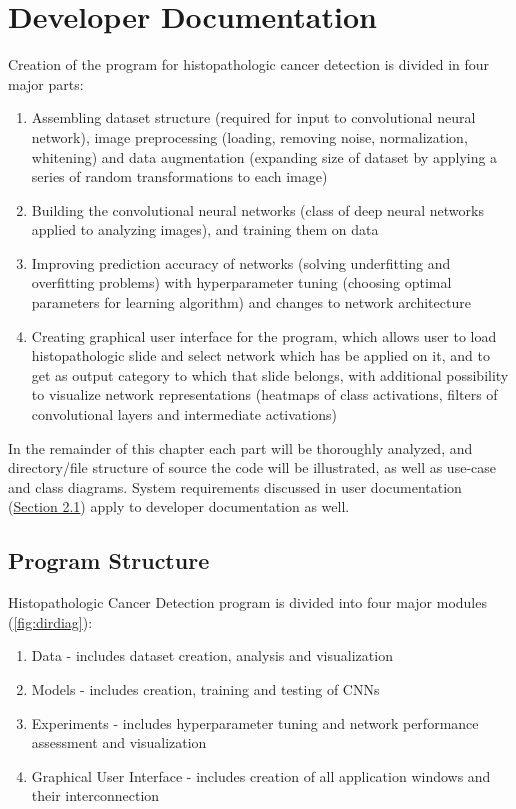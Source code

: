 \chapter{Developer Documentation} %
\label{ch:impl}

Creation of the program for histopathologic cancer detection is divided in four major parts:
\begin{enumerate}
	\itemsep0em
	\item Assembling dataset structure (required for input to convolutional neural network), image preprocessing (loading, removing noise, normalization, whitening) and data augmentation (expanding size of dataset by applying a series of random transformations to each image)
	\item Building the convolutional neural networks (class of deep neural networks applied to analyzing images), and training them on data
	\item Improving prediction accuracy of networks (solving underfitting and overfitting problems) with hyperparameter tuning (choosing optimal parameters for learning algorithm) and changes to network architecture
	\item Creating graphical user interface for the program, which allows user to load histopathologic slide and select network which has be applied on it, and to get as output category to which that slide belongs, with additional possibility to visualize network representations (heatmaps of class activations, filters of convolutional layers and intermediate activations)
\end{enumerate}
In the remainder of this chapter each part will be thoroughly analyzed, and directory/file structure of source the code will be illustrated, as well as use-case and class diagrams. System requirements discussed in user documentation (\textcolor{red}{\hyperref[sysreq]{Section 2.1}}) apply to developer documentation as well. 
\clearpage

\section{Program Structure}

Histopathologic Cancer Detection program is divided into four major modules (\textcolor{red}{\autoref{fig:dirdiag}}):
\begin{enumerate}
	\itemsep 0em
	\item Data - includes dataset creation, analysis and visualization
	\item Models - includes creation, training and testing of CNNs
	\item Experiments - includes hyperparameter tuning and network performance assessment and visualization
	\item Graphical User Interface - includes creation of all application windows and their interconnection
\end{enumerate}

